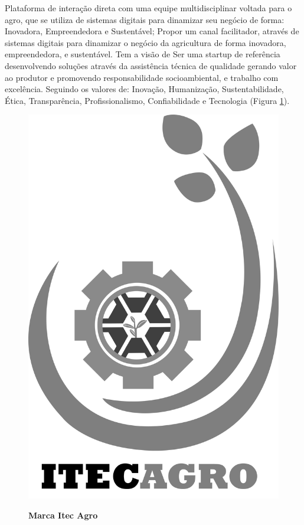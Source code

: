 Plataforma de interação direta com uma equipe multidisciplinar voltada
para o agro, que se utiliza de sistemas digitais para dinamizar seu negócio de forma: Inovadora, Empreendedora e Sustentável; Propor um canal facilitador, através de sistemas digitais para dinamizar o negócio da agricultura de forma inovadora, empreendedora, e sustentável.
Tem a visão de Ser uma startup de referência desenvolvendo soluções através da assistência técnica de qualidade gerando valor ao produtor e promovendo responsabilidade socioambiental, e trabalho com excelência.
Seguindo os valores de: Inovação, Humanização, Sustentabilidade, Ética, Transparência, Profissionalismo, Confiabilidade e Tecnologia (Figura \ref{figura_46}).

\begin{figure}[!htb]
\centering
\caption{\textbf{Marca Itec Agro}}
\includegraphics[scale=0.1]{Imagens/itecagro.png}
\label{figura_46}
\end{figure}
\newpage


